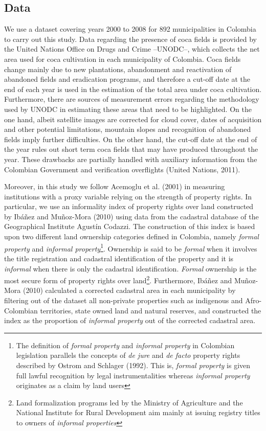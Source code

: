 \documentclass[12pt,a4paper,english]{article}%
\begin{document}
\subsection{Data}
\label{data}

We use a dataset covering years 2000 to 2008 for 892 municipalities in Colombia to carry out this study. Data regarding the presence of coca fields is provided by the United Nations Office on Drugs and Crime --UNODC--, which collects the net area used for coca cultivation in each municipality of Colombia. Coca fields change mainly due to new plantations, abandonment and reactivation of abandoned fields and eradication programs, and therefore a cut-off date at the end of each year is used in the estimation of the total area under coca cultivation. Furthermore, there are sources of measurement errors regarding the methodology used by UNODC in estimating these areas that need to be highlighted. On the one hand, albeit satellite images are corrected for cloud cover, dates of acquisition and other potential limitations, mountain slopes and recognition of abandoned fields imply further difficulties. On the other hand, the cut-off date at the end of the year rules out short term coca fields that may have produced throughout the year. These drawbacks are partially handled with auxiliary information from the Colombian Government and verification overflights (United Nations, 2011).

Moreover, in this study we follow Acemoglu et al. (2001) in measuring institutions with a proxy variable relying on the strength of property rights. In particular, we use an informality index of property rights over land constructed by Ib\'{a}\~{n}ez and Mu\~{n}oz-Mora (2010) using data from the cadastral database of the Geographical Institute Agust\'{i}n Codazzi. The construction of this index is based upon two different land ownership categories defined in Colombia, namely \emph{formal property} and \emph{informal property}\footnote{The definition of \emph{formal property} and \emph{informal property} in Colombian legislation parallels the concepts of \emph{de jure} and \emph{de facto} property rights described by Ostrom and Schlager (1992). This is, \emph{formal property} is given full lawful recognition by legal instrumentalities whereas \emph{informal property} originates as a claim by land users}. Ownership is said to be \emph{formal} when it involves the title registration and cadastral identification of the property and it is \emph{informal} when there is only the cadastral identification. \emph{Formal} ownership is the most secure form of property rights over land\footnote{Land formalization programs led by the Ministry of Agriculture and the National Institute for Rural Development aim mainly at issuing registry titles to owners of \emph{informal properties}}. Furthermore, Ib\'{a}\~{n}ez and Mu\~{n}oz-Mora (2010) calculated a corrected cadastral area in each municipality by filtering out of the dataset all non-private properties such as indigenous and Afro-Colombian territories, state owned land and natural reserves, and constructed the index as the proportion of \emph{informal property} out of the corrected cadastral area.
\end{document}
